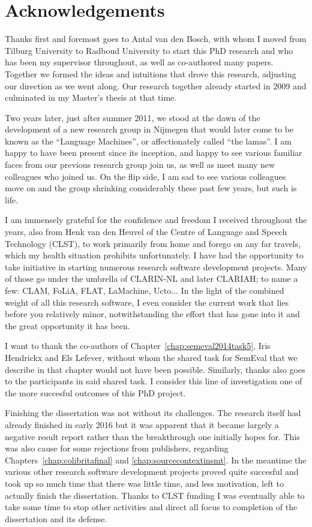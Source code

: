 \chapter*{Acknowledgements}

Thanks first and foremost goes to Antal van den Bosch, with whom I moved from
Tilburg University to Radboud University to start this PhD research and who has
been my supervisor throughout, as well as co-authored many papers. Together we formed
the ideas and intuitions that drove this research, adjusting our direction as
we went along. Our research together already started in 2009
and culminated in my Master's thesis at that time.

Two years later, just after summer 2011, we stood at the dawn of the
development of a new research group in Nijmegen that would later come to be
known as the ``Language Machines'', or affectionately called ``the lamas''.  I
am happy to have been present since its inception, and happy to see
various familiar faces from our previous research group join us, as well as
meet many new colleagues who joined us. On the flip side, I am sad to see various colleagues
move on and the group shrinking considerably these past few years, but such is life.

I am immensely grateful for the confidence and freedom I received throughout the
years, also from Henk van den Heuvel of the Centre of Language and Speech
Technology (CLST), to work primarily from home and forego on any far travels,
which my health situation prohibits unfortunately. I have had the opportunity to take
initiative in starting numerous research software development projects. Many of
those go under the umbrella of CLARIN-NL and later CLARIAH; to name a few:
CLAM, FoLiA, FLAT, LaMachine, Ucto... In the light of the combined weight of
all this research software, I even consider the current work that lies before
you relatively minor, notwithstanding the effort that has gone into it and the
great opportunity it has been.

I want to thank the co-authors of Chapter~\ref{chap:semeval2014task5}, Iris
Hendrickx and Els Lefever, without whom the shared task for SemEval that we
describe in that chapter would not have been possible. Similarly, thanks also
goes to the participants in said shared task. I consider this line of
investigation one of the more succesful outcomes of this PhD project.

Finishing the dissertation was not without its challenges. The research itself
had already finished in early 2016 but it was apparent that it became largely a
negative result report rather than the breakthrough one initially hopes for.
This was also cause for some rejections from publishers, regarding
Chapters~\ref{chap:colibritafinal} and \ref{chap:sourcecontextinsmt}. In the
meantime the various other research software development projects proved quite
succesful and took up so much time that there was little time, and less
motivation, left to actually finish the dissertation. Thanks to CLST funding I
was eventually able to take some time to stop other activities and direct
all focus to completion of the dissertation and its defense.

